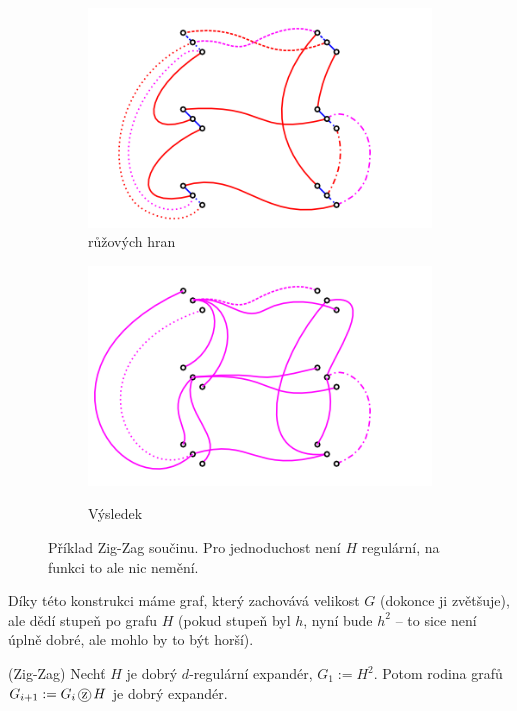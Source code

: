 \begin{figure}
\begin{subfigure}{7.5cm}{\includegraphics[width=\textwidth]{img/zigzag3.png}}
{růžových hran}\end{subfigure}
\begin{subfigure}{7.5cm}{\includegraphics[width=\textwidth]{img/zigzag4.png}}\caption{Výsledek}\end{subfigure}
\caption{Příklad Zig-Zag součinu. Pro jednoduchost není $H$ regulární, na funkci
to ale nic nemění.}
\end{figure}

\poz Díky této konstrukci máme graf, který zachovává velikost $G$ (dokonce ji 
zvětšuje), ale dědí stupeň po grafu $H$ (pokud stupeň byl $h$, nyní bude $h^2$ 
-- to sice není úplně dobré, ale mohlo by to být horší).

\vt (Zig-Zag) Nechť $H$ je dobrý $d$-regulární expandér, $G_1 := H^2$. Potom 
rodina grafů $G_{i+1} := G_i\zz H$ je dobrý expandér.
